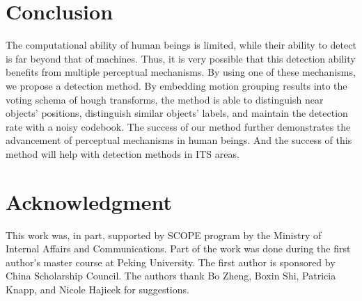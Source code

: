 \documentclass{mva2011}
\begin{document}
\section{Conclusion}
The computational ability of human beings is limited, while their ability to detect is far beyond that of machines. Thus, it is very possible that this detection ability benefits from multiple perceptual mechanisms. By using one of these mechanisms, we propose a detection method.  By embedding motion grouping results into the voting schema of hough transforms, the method is able to distinguish near objects' positions, distinguish similar objects' labels, and maintain the detection rate with a noisy codebook. The success of our method further demonstrates the advancement of perceptual mechanisms in human beings. And the success of this method will help with detection methods in ITS areas.


\section*{Acknowledgment}
This work was, in part, supported by SCOPE program by the Ministry of Internal Affairs and Communications. Part of the work was done during the first author's master course at Peking University. The first author is sponsored by China Scholarship Council. The authors thank Bo Zheng, Boxin Shi, Patricia Knapp, and Nicole Hajicek for suggestions.







%
%
%
\end{document}
